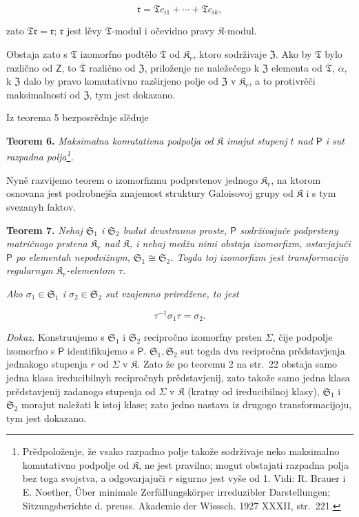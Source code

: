 \documentclass[11pt]{article}
\newcommand{\srcfn}[2]{\footnote{#2}}
\newcommand{\foreign}[1]{#1}
\begin{document}
\[
\mathfrak r=\mathfrak T c_{i1}+\cdots+\mathfrak T c_{ik},
\]

zato \(\mathfrak T\mathfrak r=\mathfrak r\); \(\mathfrak r\) jest lěvy \(\mathfrak T\)-modul i očevidno pravy \(\mathfrak K\)-modul.

Obstaja zato s \(\mathfrak T\) izomorfno podtělo \(\overline{\mathfrak T}\) od \(\mathfrak K_r\), ktoro sodrživaje \(\mathfrak Z\). Ako by \(\mathfrak T\) bylo različno od \(\mathsf{Z}\), to \(\overline{\mathfrak T}\) različno od \(\mathfrak Z\), priloženje ne naležečego k \(\mathfrak Z\) elementa od \(\overline{\mathfrak T}\), \(\alpha\), k \(\mathfrak Z\) dalo by pravo komutativno razširjeno polje od \(\mathfrak Z\) v \(\mathfrak K_r\), a to protivrěči maksimalnosti od \(\mathfrak Z\), tym jest dokazano.

Iz teorema 5 bezposrědnje slěduje

\textbf{Teorem 6.} \emph{Maksimalna komutativna podpolja od \(\mathfrak K\) imajut stupenj \(t\) nad \(\mathsf P\) i sut razpadna polja\srcfn{1}{Prědpoloženje, že vsako razpadno polje takože sodrživaje neko maksimalno komutativno podpolje od \(\mathfrak K\), ne jest pravilno; mogut obstajati razpadna polja bez toga svojstva, a odgovarjajuči \(r\) sigurno jest vyše od 1. Vidi: \foreign{R. Brauer} i \foreign{E. Noether}, \foreign{Über minimale Zerfällungskörper irreduzibler Darstellungen; Sitzungsberichte d. preuss. Akademie der Wisssch. 1927 XXXII, str.~221.}}.}

Nyně razvijemo teorem o izomorfizmu podprstenov jednogo \(\mathfrak K_r\), na ktorom osnovana jest podrobnejša znajemost struktury Galoisovoj grupy od \(\mathfrak K\) i s tym svezanyh faktov.

\textbf{Teorem 7.} \emph{Nehaj \(\mathfrak S_1\) i \(\mathfrak S_2\) budut dvustranno proste, \(\mathsf P\) sodrživajuče podprsteny matričnogo prstena \(\mathfrak K_r\) nad \(\mathfrak K\), i nehaj medžu nimi obstaja izomorfizm, ostavjajuči \(\mathsf P\) po elementah nepodvižnym, \(\mathfrak S_1\cong\mathfrak S_2\). Togda toj izomorfizm jest transformacija regularnym \(\mathfrak K_r\)-elementom \(\tau\).}

\emph{Ako \(\sigma_1\in\mathfrak S_1\) i \(\sigma_2\in\mathfrak S_2\) sut vzajemno priredžene, to jest}

\[
\tau^{-1}\sigma_1\tau=\sigma_2.
\]

\emph{Dokaz.} Konstruujemo s \(\mathfrak S_1\) i \(\mathfrak S_2\) recipročno izomorfny prsten \(\Sigma\), čije podpolje izomorfno s \(\mathsf P\) identifikujemo s \(\mathsf P\). \(\mathfrak S_1,\mathfrak S_2\) sut togda dva recipročna prědstavjenja jednakogo stupenja \(r\) od \(\Sigma\) v \(\mathfrak K\). Zato že po teoremu 2 na str.~22 obstaja samo jedna klasa ireducibilnyh recipročnyh prědstavjenij, zato takože samo jedna klasa prědstavjenij zadanogo stupenja od \(\Sigma\) v \(\mathfrak K\) (kratny od ireducibilnoj klasy), \(\mathfrak S_1\) i \(\mathfrak S_2\) morajut naležati k istoj klase; zato jedno nastava iz drugogo transformacijoju, tym jest dokazano.
\end{document}
